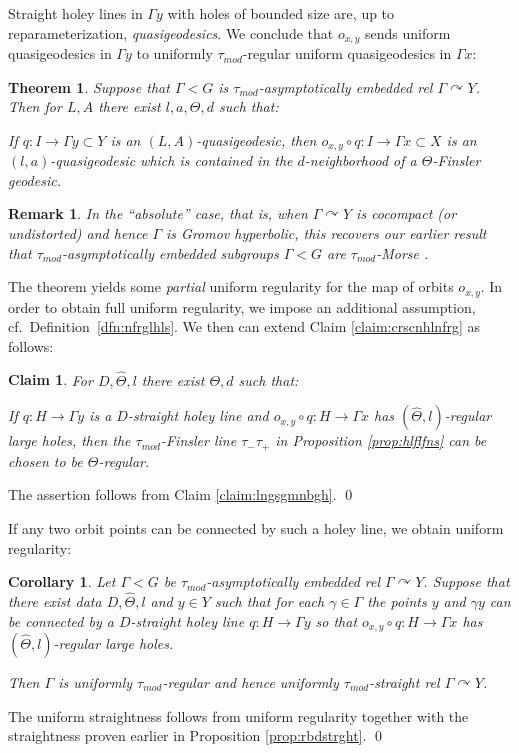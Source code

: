\documentclass[12pt]{article}
\theoremstyle{boldplain}
\newtheorem{claim}[equation]{Claim}
\newtheorem{cor}[equation]{Corollary}
\newtheorem{thm}[equation]{Theorem}
\theoremstyle{bolddefinition}
\newtheorem{rem}[equation]{Remark}
\numberwithin{equation}{section}
\def\ga{\gamma}
\def\Ga{\Gamma}
\def\acts{\curvearrowright}
\def\taumod{\tau_{mod}}
\begin{document}
\medskip
Straight holey lines in $\Ga y$ with holes of bounded size are, up to reparameterization, {\em quasigeodesics}.
We conclude that $o_{x,y}$ sends uniform quasigeodesics in $\Ga y$ 
to uniformly $\taumod$-regular uniform quasigeodesics in $\Ga x$:
\begin{thm}
Suppose that $\Ga<G$ is $\taumod$-asymptotically embedded rel $\Ga\acts Y$. 
Then for $L,A$ there exist $l,a,\Theta,d$ such that:

If $q:I\to\Ga y\subset Y$ is an $(L,A)$-quasigeodesic,
then $o_{x,y}\circ q:I\to\Ga x\subset X$ is an $(l,a)$-quasigeodesic 
which is contained in the $d$-neighborhood of a $\Theta$-Finsler geodesic.
\end{thm}

\begin{rem}
In the ``absolute'' case, that is, when $\Ga\acts Y$ is cocompact (or undistorted) and hence $\Ga$ is Gromov hyperbolic,
this recovers our earlier result 
that $\taumod$-asymptotically embedded subgroups $\Ga<G$ are $\taumod$-Morse
\cite{anolec}.
\end{rem}

The theorem yields some {\em partial} uniform regularity for the map of orbits $o_{x,y}$.
In order to obtain full uniform regularity,
we impose an additional assumption, cf.\ Definition~\ref{dfn:nfrglhls}.
We then can extend Claim \ref{claim:crscnhlnfrg} as follows:

\begin{claim}
\label{claim:nfrglhls}
For $D,\hat\Theta,l$ there exist $\Theta,d$ such that:

If $q:H\to\Ga y$ is a $D$-straight holey line 
and $o_{x,y}\circ q:H\to\Ga x$ has $(\hat\Theta,l)$-regular large holes,
then the $\taumod$-Finsler line $\tau_-\tau_+$ in Proposition \ref{prop:hlflfns} 
can be chosen to be $\Theta$-regular.
\end{claim}
\proof The assertion follows from Claim \ref{claim:lngsgmnbgh}. \qed 

\medskip
If any two orbit points can be connected by such a holey line,
we obtain uniform regularity:

\begin{cor}
\label{cor:cntblnfrglhls}
Let $\Ga<G$ be $\taumod$-asymptotically embedded rel $\Ga\acts Y$. 
Suppose that there exist data $D,\hat\Theta,l$ and $y\in Y$ 
such that for each $\ga\in\Ga$
the points $y$ and $\ga y$ can be connected by a $D$-straight holey line $q:H\to\Ga y$
so that $o_{x,y}\circ q:H\to\Ga x$ has $(\hat\Theta,l)$-regular large holes.

Then $\Ga$ is uniformly $\taumod$-regular
and hence uniformly $\taumod$-straight rel $\Ga\acts Y$.
\end{cor}
\proof
The uniform straightness follows from uniform regularity together with the straightness proven earlier in Proposition \ref{prop:rbdstrght}.
\qed
\end{document}
